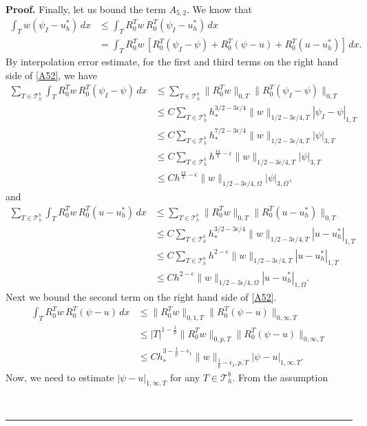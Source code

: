 \documentclass[12pt]{article}
\newenvironment{proof}[1][Proof]{\textbf{#1.} }
{\ \rule{0.75em}{0.75em}\smallskip}
\begin{document}
\begin{proof}
Finally, let us bound the term $A_{5,2}$. We know that
\begin{align}
\int_T w(\psi_I - u_h^*)\,dx &\leq \int_T R^T_0 w \, R^T_0(\psi_I - u_h^*)\,dx \nonumber\\
& =\int_T R^T_0 w \, [R^T_0(\psi_I -\psi) + R^T_0(\psi - u) + R^T_0(u - u_h^*)]\,dx.\label{A52}
\end{align}
By interpolation error estimate, for the first and third terms on the right hand side of \eqref{A52}, we have
\begin{align*}
\sum_{T\in \mathcal{T}_h^b} \int_T R^T_0 w \, R^T_0(\psi_I -\psi) \,dx  
&\leq \sum_{T\in \mathcal{T}_h^b} \|R^T_0 w\|_{0,T} \|R^T_0(\psi_I -\psi)\|_{0,T}\\
&\leq  C \sum_{T\in \mathcal{T}_h^b} h_*^{3/2-3\epsilon/4}  \|w\|_{1/2-3\epsilon/4, T}|\psi_I -\psi|_{1,T} \\
&\leq C \sum_{T\in \mathcal{T}_h^b} h_*^{7/2-3\epsilon/4}   \|w\|_{1/2-3\epsilon/4, T}|\psi|_{3,T}\\ 
&\leq  C \sum_{T\in \mathcal{T}_h^b} h^{\frac{14}{3}-\epsilon}   \|w\|_{1/2-3\epsilon/4, T}|\psi|_{3,T}\\
&\leq C h^{\frac{14}{3}-\epsilon}   \|w\|_{1/2-3\epsilon/4, \Omega}|\psi|_{3,\Omega}, 
\end{align*}
and
\begin{align*}
\sum_{T\in \mathcal{T}_h^b} \int_T R^T_0 w \, R^T_0(u - u_h^*) \,dx  
&\leq \sum_{T\in \mathcal{T}_h^b} \|R^T_0 w\|_{0,T} \|R^T_0(u - u_h^*)\|_{0,T}\\
&\leq  C \sum_{T\in \mathcal{T}_h^b} h_*^{3/2-3\epsilon/4}  \|w\|_{1/2-3\epsilon/4, T}|u - u_h^*|_{1,T} \\
&\leq C \sum_{T\in \mathcal{T}_h^b} h^{2-\epsilon}   \|w\|_{1/2-3\epsilon/4, T}|u - u_h^*|_{1,T}\\ 
&\leq  C  h^{2-\epsilon}   \|w\|_{1/2-3\epsilon/4, \Omega}|u - u_h^*|_{1,\Omega}.
\end{align*}
Next we bound the second term on the right hand side of \eqref{A52}.
\begin{align*}
\int_T R^T_0 w \, R^T_0(\psi - u) \,dx 
& \leq \|R^T_0 w\|_{0,1,T} \|R^T_0(\psi - u)\|_{0,\infty,T}\\
&\leq  |T|^{1-\frac{1}{p}} \|R^T_0 w\|_{0,p,T} \|R^T_0(\psi - u)\|_{0,\infty,T}\\
&\leq C h_*^{3-\frac{1}{p}-\epsilon_1}\|w\|_{\frac{1}{p}-\epsilon_1,p,T}|\psi-u|_{1,\infty,T}.
\end{align*}
Now, we need to estimate $|\psi-u|_{1,\infty,T}$ for
any $T\in \mathcal{T}_h^b$.  From the assumption

\end{proof}
\end{document}
